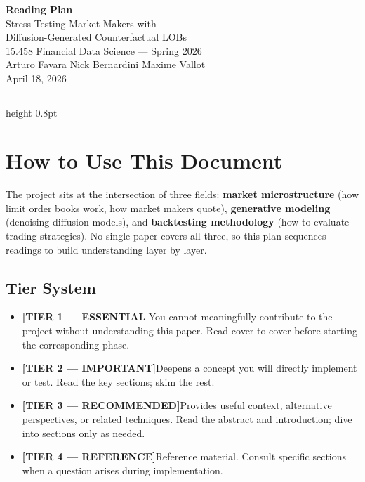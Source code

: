 \documentclass[11pt,a4paper]{article}
\newcommand{\tierone}{\textcolor{tier1}{\textbf{[TIER 1 --- ESSENTIAL]}}}
\newcommand{\tiertwo}{\textcolor{tier2}{\textbf{[TIER 2 --- IMPORTANT]}}}
\newcommand{\tierthree}{\textcolor{tier3}{\textbf{[TIER 3 --- RECOMMENDED]}}}
\newcommand{\tierfour}{\textcolor{tier4}{\textbf{[TIER 4 --- REFERENCE]}}}
\begin{document}
\begin{center}
  {\LARGE\bfseries Reading Plan}\\[6pt]
  {\Large Stress-Testing Market Makers with\\
  Diffusion-Generated Counterfactual LOBs}\\[10pt]
  {\large 15.458 Financial Data Science --- Spring 2026}\\[4pt]
  {\normalsize Arturo Favara \quad Nick Bernardini \quad Maxime Vallot}\\[4pt]
  {\small April 18, 2026}
\end{center}

\vspace{0.3cm}
\hrule height 0.8pt
\vspace{0.5cm}

\section*{How to Use This Document}

The project sits at the intersection of three fields: \textbf{market microstructure} (how limit order books work, how market makers quote), \textbf{generative modeling} (denoising diffusion models), and \textbf{backtesting methodology} (how to evaluate trading strategies).  No single paper covers all three, so this plan sequences readings to build understanding layer by layer.

\subsection*{Tier System}

\begin{itemize}
  \item \tierone You cannot meaningfully contribute to the project without understanding this paper.  Read cover to cover before starting the corresponding phase.
  \item \tiertwo Deepens a concept you will directly implement or test.  Read the key sections; skim the rest.
  \item \tierthree Provides useful context, alternative perspectives, or related techniques.  Read the abstract and introduction; dive into sections only as needed.
  \item \tierfour Reference material.  Consult specific sections when a question arises during implementation.
\end{itemize}
\end{document}
